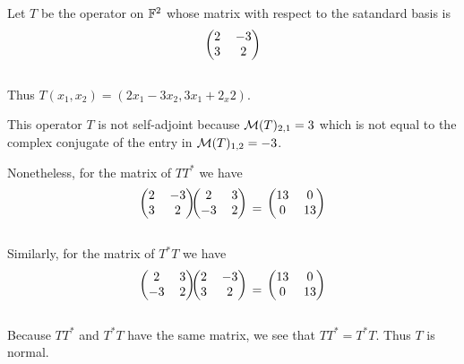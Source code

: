 \begin{example}
  Let $T$ be the operator on $\mathbb{F}^2$ whose matrix with respect to the satandard basis is
  \[
    \begin{blockarray}{(cc)}
      2 & -3 \\
      3 & 2 \\
    \end{blockarray}
  \]

  Thus $T(x_1, x_2) = (2x_1-3x_2, 3x_1 + 2_x2)$.

  This operator $T$ is not self-adjoint because $\mathcal{M}(T)_{2,1} = 3$ which is not equal to the complex conjugate of the entry in $\mathcal{M}(T)_{1,2} = -3$.

  Nonetheless, for the matrix of $TT^*$ we have
  \[
  \begin{blockarray}{(cc)}
    2 & -3 \\
    3 & 2 \\
  \end{blockarray}
  \begin{blockarray}{(cc)}
  2 & 3 \\
  -3 & 2 \\
  \end{blockarray}
  \;=\;
  \begin{blockarray}{(cc)}
  13 & 0 \\
  0 & 13 \\
  \end{blockarray}
  \]

  Similarly, for the matrix of $T^*T$ we have
  \[
  \begin{blockarray}{(cc)}
  2 & 3 \\
  -3 & 2 \\
  \end{blockarray}
  \begin{blockarray}{(cc)}
    2 & -3 \\
    3 & 2 \\
  \end{blockarray}
  \;=\;
  \begin{blockarray}{(cc)}
    13 & 0 \\
    0 & 13 \\
  \end{blockarray}
  \]

  Because $TT^*$ and $T^*T$ have the same matrix, we see that $TT^* = T^*T$. Thus $T$ is normal.
\end{example}


